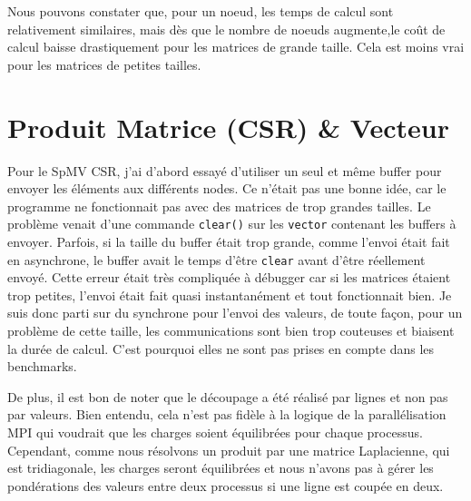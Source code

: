 \documentclass[10pt,twocolumn,letterpaper]{article}
\def\code#1{\texttt{#1}}
\begin{document}

Nous pouvons constater que, pour un noeud, les temps de calcul sont relativement similaires, 
mais dès que le nombre de noeuds augmente,le coût de calcul baisse drastiquement pour les matrices de grande taille.
Cela est moins vrai pour les matrices de petites tailles.

\section{Produit Matrice (CSR) \& Vecteur}

Pour le SpMV CSR, j'ai d'abord essayé d'utiliser un seul et même buffer pour envoyer les éléments
aux différents nodes. Ce n'était pas une bonne idée, car le programme ne fonctionnait pas avec des matrices de trop grandes tailles.
Le problème venait d'une commande \code{clear()} sur les \code{vector} contenant les buffers à envoyer.
Parfois, si la taille du buffer était trop grande, comme l'envoi était fait en asynchrone, le buffer avait le temps d'être \code{clear} avant d'être réellement envoyé.
Cette erreur était très compliquée à débugger car si les matrices étaient trop petites, l'envoi était fait quasi instantanément et tout fonctionnait bien.
Je suis donc parti sur du synchrone pour l'envoi des valeurs, de toute façon, pour un problème de cette taille, 
les communications sont bien trop couteuses et biaisent la durée de calcul.
C'est pourquoi elles ne sont pas prises en compte dans les benchmarks.

De plus, il est bon de noter que le découpage a été réalisé par lignes et non pas par valeurs. 
Bien entendu, cela n'est pas fidèle à la logique de la parallélisation MPI qui voudrait que les charges soient équilibrées pour chaque processus.
Cependant, comme nous résolvons un produit par une matrice Laplacienne, qui est tridiagonale, 
les charges seront équilibrées et nous n'avons pas à gérer les pondérations des valeurs entre deux processus si une ligne est coupée en deux.

\end{document}
